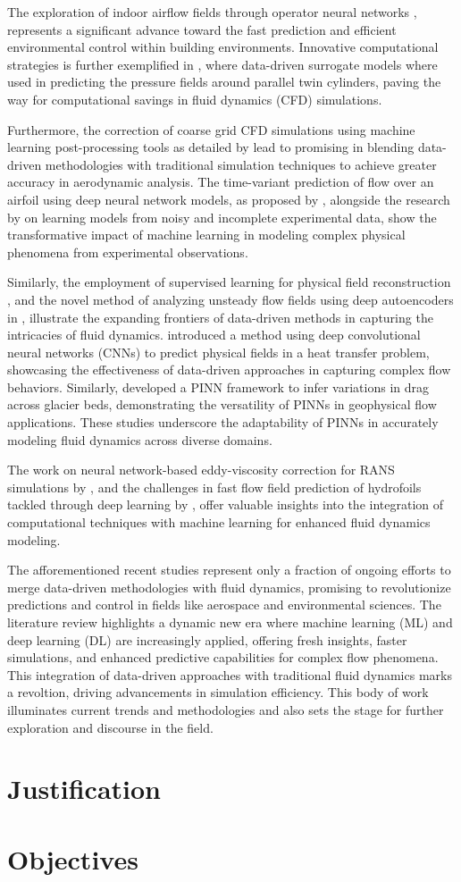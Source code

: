 The exploration of indoor airflow fields through operator neural networks \cite{Gao2024}, represents a significant advance toward the fast prediction and efficient environmental control within building environments. Innovative computational strategies is further exemplified in , where data-driven surrogate models where used in predicting the pressure fields around parallel twin cylinders, paving the way for computational savings in fluid dynamics (CFD) simulations.

Furthermore, the correction of coarse grid CFD simulations using machine learning post-processing tools as detailed by  lead to promising in blending data-driven methodologies with traditional simulation techniques to achieve greater accuracy in aerodynamic analysis. The time-variant prediction of flow over an airfoil using deep neural network models, as proposed by \cite{Peng2020b}, alongside the research by  on learning models from noisy and incomplete experimental data, show the transformative impact of machine learning in modeling complex physical phenomena from experimental observations.

Similarly, the employment of supervised learning for physical field reconstruction \cite{Liu2021c}, and the novel method of analyzing unsteady flow fields using deep autoencoders in \cite{Omata2019c}, illustrate the expanding frontiers of data-driven methods in capturing the intricacies of fluid dynamics.  introduced a method using deep convolutional neural networks (CNNs) to predict physical fields in a heat transfer problem, showcasing the effectiveness of data-driven approaches in capturing complex flow behaviors. Similarly,  developed a PINN framework to infer variations in drag across glacier beds, demonstrating the versatility of PINNs in geophysical flow applications. These studies underscore the adaptability of PINNs in accurately modeling fluid dynamics across diverse domains.

The work on neural network-based eddy-viscosity correction for RANS simulations by \cite{Volpiani2022}, and the challenges in fast flow field prediction of hydrofoils tackled through deep learning by \cite{Li2023}, offer valuable insights into the integration of computational techniques with machine learning for enhanced fluid dynamics modeling.

The afforementioned recent studies represent only a fraction of ongoing efforts to merge data-driven methodologies with fluid dynamics, promising to revolutionize predictions and control in fields like aerospace and environmental sciences. The literature review highlights a dynamic new era where machine learning (ML) and deep learning (DL) are increasingly applied, offering fresh insights, faster simulations, and enhanced predictive capabilities for complex flow phenomena. This integration of data-driven approaches with traditional fluid dynamics marks a revoltion, driving advancements in simulation efficiency. This body of work illuminates current trends and methodologies and also sets the stage for further exploration and discourse in the field.

\section{Justification}

\section{Objectives}